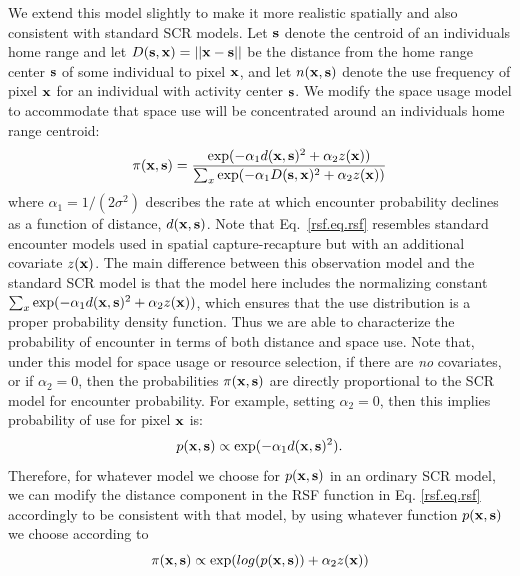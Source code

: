\documentclass[12pt]{article}
\begin{document}
We extend this model slightly to make it more realistic spatially and
also consistent with standard SCR models. Let
${\bf s}$ denote the centroid of an individuals home range and let
$D({\bf s},{\bf x}) = ||{\bf x} - {\bf s}||$ be the distance from the home
range center ${\bf s}$ of some individual to pixel ${\bf x}$, and let
$n({\bf x},{\bf s})$ denote the use frequency of pixel ${\bf x}$ for an individual with
activity center ${\bf s}$. 
We modify the space usage model to accommodate that space
use will be concentrated around an individuals home range centroid:
\begin{equation}
 \pi({\bf x},{\bf s})  = \frac{ \exp( -\alpha_{1} d({\bf x},{\bf s})^{2} +\alpha_{2} z({\bf x}) )}
{ \sum_{x} \exp(-\alpha_{1} D({\bf s},{\bf x})^{2} +\alpha_{2} z({\bf x}))}
\label{rsf.eq.rsf}
\end{equation}
 where $\alpha_1=1/(2\sigma^2)$ describes the rate at
which encounter 
probability declines as a function of distance, $d({\bf x},{\bf s})$.
Note that
Eq.~\ref{rsf.eq.rsf} resembles standard encounter models used in
spatial capture-recapture but with an additional covariate $z({\bf
  x})$.
The main difference between this observation model and the standard
SCR
model is that the model here
includes the normalizing
constant $\sum_{x} \exp(-\alpha_{1} d({\bf x},{\bf s})^{2} +\alpha_{2} z({\bf
  x}))$, which ensures that the use distribution is a proper
probability density function. Thus we are able to characterize the
probability of encounter in terms of both distance and space use.
Note that, under
this model for space usage or resource selection, if there are {\it no}
covariates, or if $\alpha_{2} = 0$, then the probabilities
$\pi({\bf x},{\bf s})$ are directly proportional to the SCR model for encounter
probability.  For example, setting $\alpha_{2} = 0$, then this implies
probability of use for pixel ${\bf x}$ is:
\[
p({\bf x},{\bf s}) \propto  \exp( -\alpha_{1} d({\bf x},{\bf s})^{2}).
\]
Therefore,
for whatever model we choose for
$p({\bf x},{\bf s})$ in an ordinary SCR model, we can modify the distance
component in the RSF function in Eq. \ref{rsf.eq.rsf} accordingly to
be consistent with that model, by using whatever function $p({\bf
  x},{\bf s})$ we 
choose according to
\[
\pi({\bf x},{\bf s}) \propto \exp( log(p({\bf x},{\bf s})) + \alpha_{2} z({\bf x}))
\]
\end{document}
